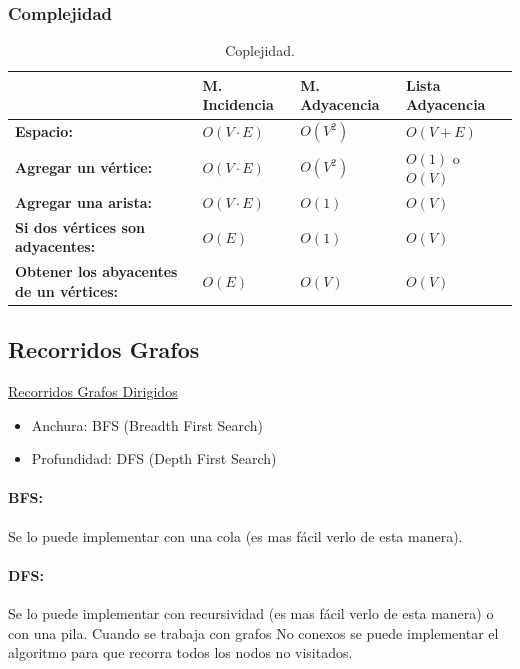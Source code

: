 \documentclass[../main.tex]{subfiles}
\begin{document}
            \newpage

            \subsubsection{Complejidad}
    
                \begin{table}[ht]
                    \centering
                    \begin{tabular}{|l|l|l|l|}
                    \hline
                        & M. Incidencia & M. Adyacencia & Lista Adyacencia\\ \hline
                        \textbf{Espacio:} & $O(V \cdot E)$ & $O(V^2)$ & $O(V + E)$\\ \hline
                        \textbf{Agregar un vértice:}  & $O(V \cdot E)$ & $O(V^2)$ & $O(1)$ o $O(V)$\\ \hline
                        \textbf{Agregar una arista:} & $O(V \cdot E)$ & $O(1)$ & $O(V)$ \\ \hline
                        \textbf{Si dos vértices son adyacentes:} & $O(E)$ & $O(1)$ & $O(V)$\\ \hline
                        \textbf{Obtener los abyacentes de un vértices:} & $O(E)$ & $O(V)$ & $O(V)$\\ \hline
                    \end{tabular}
                    \caption[short]{Coplejidad.}
                \end{table}

        \subsection{Recorridos Grafos}
            \underline{Recorridos Grafos Dirigidos}
            \begin{itemize}
                \item Anchura: BFS (Breadth First Search)
                \item Profundidad: DFS (Depth First Search)
            \end{itemize}

      
            \paragraph{BFS:} Se lo puede implementar con una cola (es mas fácil verlo de esta manera).
            \paragraph{DFS:} Se lo puede implementar con recursividad (es mas fácil verlo de esta manera) o con una pila. Cuando se trabaja con grafos No conexos se puede implementar el algoritmo para que recorra todos los nodos no visitados.\\
\end{document}
